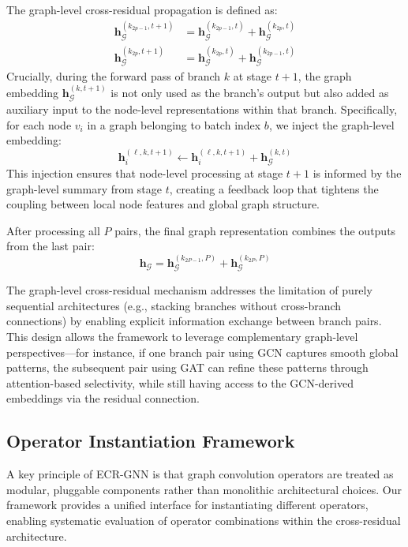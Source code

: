The graph-level cross-residual propagation is defined as:
\begin{align}
\mathbf{h}_{\mathcal{G}}^{(k_{2p-1}, t+1)} &= \mathbf{h}_{\mathcal{G}}^{(k_{2p-1}, t)} + \mathbf{h}_{\mathcal{G}}^{(k_{2p}, t)} \label{eq:graph_level_1} \\
\mathbf{h}_{\mathcal{G}}^{(k_{2p}, t+1)} &= \mathbf{h}_{\mathcal{G}}^{(k_{2p}, t)} + \mathbf{h}_{\mathcal{G}}^{(k_{2p-1}, t)} \label{eq:graph_level_2}
\end{align}
Crucially, during the forward pass of branch $k$ at stage $t+1$, the graph embedding $\mathbf{h}_{\mathcal{G}}^{(k, t+1)}$ is not only used as the branch's output but also added as auxiliary input to the node-level representations within that branch. Specifically, for each node $v_i$ in a graph belonging to batch index $b$, we inject the graph-level embedding:
\begin{equation}
\mathbf{h}_i^{(\ell, k, t+1)} \leftarrow \mathbf{h}_i^{(\ell, k, t+1)} + \mathbf{h}_{\mathcal{G}}^{(k, t)}
\end{equation}
This injection ensures that node-level processing at stage $t+1$ is informed by the graph-level summary from stage $t$, creating a feedback loop that tightens the coupling between local node features and global graph structure.

After processing all $P$ pairs, the final graph representation combines the outputs from the last pair:
\begin{equation}
\mathbf{h}_{\mathcal{G}} = \mathbf{h}_{\mathcal{G}}^{(k_{2P-1}, P)} + \mathbf{h}_{\mathcal{G}}^{(k_{2P}, P)}
\end{equation}

The graph-level cross-residual mechanism addresses the limitation of purely sequential architectures (e.g., stacking branches without cross-branch connections) by enabling explicit information exchange between branch pairs. This design allows the framework to leverage complementary graph-level perspectives—for instance, if one branch pair using GCN captures smooth global patterns, the subsequent pair using GAT can refine these patterns through attention-based selectivity, while still having access to the GCN-derived embeddings via the residual connection.

\subsection{Operator Instantiation Framework}

A key principle of ECR-GNN is that graph convolution operators are treated as modular, pluggable components rather than monolithic architectural choices. Our framework provides a unified interface for instantiating different operators, enabling systematic evaluation of operator combinations within the cross-residual architecture.


